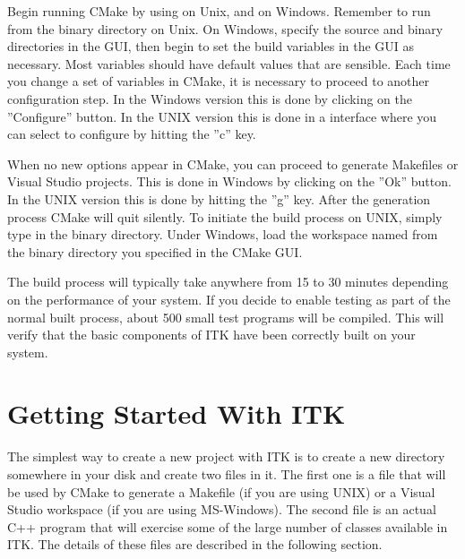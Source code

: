 Begin running CMake by using  on Unix, and  on
Windows. Remember to run  from the binary directory on Unix. On
Windows, specify the source and binary directories in the GUI, then begin to
set the build variables in the GUI as necessary.  Most variables should have
default values that are sensible. Each time you change a set of variables in
CMake, it is necessary to proceed to another configuration step. In the
Windows version this is done by clicking on the ''Configure'' button. In the
UNIX version this is done in a
 interface where you can select to configure by hitting the
''c'' key.

When no new options appear in CMake, you can proceed to generate Makefiles or
Visual Studio projects. This is done in Windows by clicking on the ''Ok''
button.  In the UNIX version this is done by hitting the ''g'' key. After the
generation process CMake will quit silently. To initiate the build process
on UNIX, simply type  in the binary directory. Under Windows, load
the workspace named  from the binary directory you specified
in the CMake GUI.

The build process will typically take anywhere from 15 to 30 minutes depending
on the performance of your system. If you decide to enable testing as part of
the normal built process, about 500 small test programs will be compiled. This
will verify that the basic components of ITK have been correctly built on your
system.


\section{Getting Started With ITK }
\label{sec:GettingStartedWithITK}
 
The simplest way to create a new project with ITK is to create a new directory
somewhere in your disk and create two files in it. The first one is a
 file that will be used by CMake to generate a Makefile
(if you are using UNIX) or a Visual Studio workspace (if you are using
MS-Windows).  The second file is an actual C++ program that will exercise
some of the large number of classes available in ITK. The details of these files
are described in the following section.

